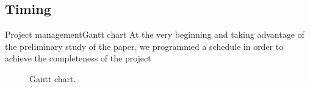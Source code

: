 \documentclass[10pt]{beamer}
\begin{document}
\subsection{Timing}
\begin{frame}{Project management}{Gantt chart}
At the very beginning and taking advantage of the preliminary study of the paper, we programmed a schedule in order to achieve the completeness of the project
    \begin{figure}
  \centering
  \caption{Gantt chart.}
  \end{figure}

\end{frame}
\end{document}
